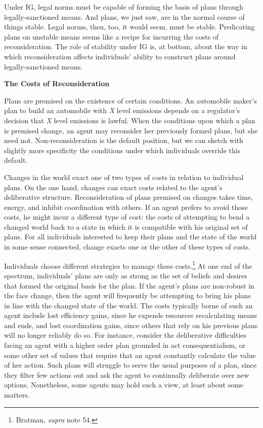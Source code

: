 Under IG, legal norms must be capable of forming the basis of plans
through legally-sanctioned means. And plans, we just saw, are in the
normal course of things stable. Legal norms, then, too, it would seem,
must be stable. Predicating plans on unstable means seems like a recipe
for incurring the costs of reconsideration. The role of stability under
IG is, at bottom, about the way in which reconsideration affects
individuals' ability to construct plans around legally-sanctioned means.

\textbf{The Costs of Reconsideration}

Plans are premised on the existence of certain conditions. An automobile
maker's plan to build an automobile with \emph{X} level emissions
depends on a regulator's decision that \emph{X} level emissions is
lawful. When the conditions upon which a plan is premised change, an
agent may reconsider her previously formed plans, but she need not.
Non-reconsideration is the default position, but we can sketch with
slightly more specificity the conditions under which individuals
override this default.

Changes in the world exact one of two types of costs in relation to
individual plans. On the one hand, changes can exact costs related to
the agent's deliberative structure. Reconsideration of plans premised on
changes takes time, energy, and inhibit coordination with others. If an
agent prefers to avoid those costs, he might incur a different type of
cost: the costs of attempting to bend a changed world back to a state in
which it is compatible with his original set of plans. For all
individuals interested to keep their plans and the state of the world in
some sense connected, change exacts one or the other of these types of
costs.

Individuals choose different strategies to manage these costs.\footnote{Bratman,
  \emph{supra} note 54.} At one end of the spectrum, individuals' plans
are only as strong as the set of beliefs and desires that formed the
original basis for the plan. If the agent's plans are non-robust in the
face change, then the agent will frequently be attempting to bring his
plans in line with the changed state of the world. The costs typically
borne of such an agent include lost efficiency gains, since he expends
resources recalculating means and ends, and lost coordination gains,
since others that rely on his previous plans will no longer reliably do
so. For instance, consider the deliberative difficulties facing an agent
with a higher order plan grounded in act consequentialism, or some other
set of values that require that an agent constantly calculate the value
of her action. Such plans will struggle to serve the usual purposes of a
plan, since they filter few actions out and ask the agent to continually
deliberate over new options. Nonetheless, some agents may hold such a
view, at least about some matters.

